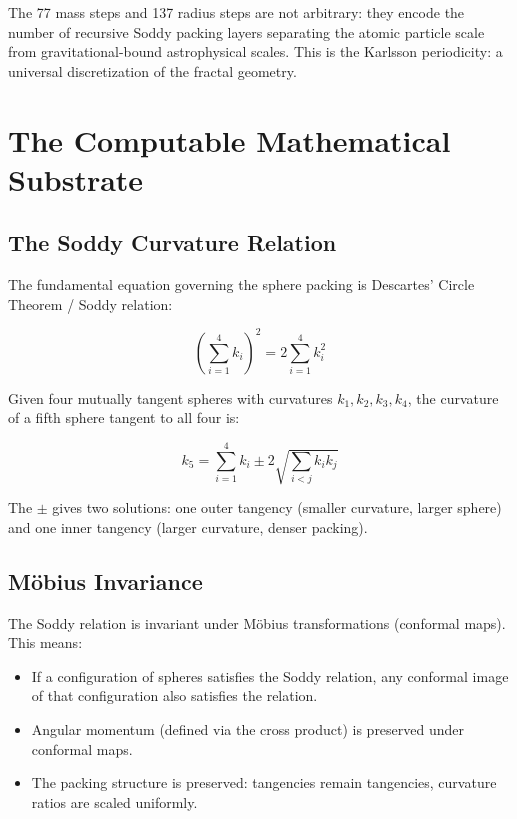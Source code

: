 \documentclass[11pt,a4paper]{article}
\begin{document}
      The 77 mass steps and 137 radius steps are not arbitrary: they encode the number of recursive Soddy packing layers separating the atomic particle scale from gravitational-bound astrophysical scales. This is the Karlsson periodicity: a universal discretization of the fractal geometry.


\section{The Computable Mathematical Substrate}

  \subsection{The Soddy Curvature Relation}

    The fundamental equation governing the sphere packing is Descartes' Circle Theorem / Soddy relation:

    \[
    \boxed{\left(\sum_{i=1}^4 k_i\right)^2 = 2\sum_{i=1}^4 k_i^2}
    \]

    Given four mutually tangent spheres with curvatures $k_1, k_2, k_3, k_4$, the curvature of a fifth sphere tangent to all four is:

    \[
    k_5 = \sum_{i=1}^4 k_i \pm 2\sqrt{\sum_{i<j} k_i k_j}
    \]

    The $\pm$ gives two solutions: one outer tangency (smaller curvature, larger sphere) and one inner tangency (larger curvature, denser packing).

  \subsection{Möbius Invariance}

    The Soddy relation is invariant under Möbius transformations (conformal maps). This means:

    \begin{itemize}
    \item If a configuration of spheres satisfies the Soddy relation, any conformal image of that configuration also satisfies the relation.
    \item Angular momentum (defined via the cross product) is preserved under conformal maps.
    \item The packing structure is preserved: tangencies remain tangencies, curvature ratios are scaled uniformly.
    \end{itemize}
\end{document}
